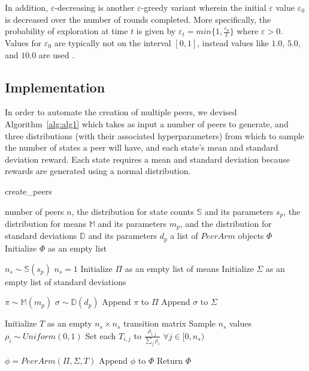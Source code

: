 \documentclass{article}
\begin{document}
In addition, $\varepsilon$-decreasing is another $\varepsilon$-greedy variant wherein the initial $\varepsilon$ value $\varepsilon_0$ is decreased over the number of rounds 
completed. More specifically, the probability of exploration at time $t$ is given by $\varepsilon_t = min\{ 1, \frac{\varepsilon_0}{t}\}$ where $\varepsilon > 0$. Values for 
$\varepsilon_0$ are typically not on the interval $[0,1]$, instead values like $1.0$, $5.0$, and $10.0$ are used \cite{mab_algos}.





\subsection{Implementation}
In order to automate the creation of multiple peers, we devised Algorithm~\ref{alg:alg1} which takes as input a number of peers to generate, and three distributions (with 
their associated hyperparameters) from which to sample the number of states a peer will have, and each state's mean and standard deviation reward. Each state requires a 
mean and standard deviation because rewards are generated using a normal distribution.

\begin{algorithm}[tb]
    \caption{create\_peers}
    \label{alg:alg1}
\begin{algorithmic}
     number of peers $n$, the distribution for state counts $\mathbb{S}$ and its parameters $s_p$, the distribution for means $\mathbb{M}$ and 
    its parameters $m_p$, and the distribution for standard deviations $\mathbb{D}$ and its parameters $d_p$
     a list of $PeerArm$ objects $\Phi$
    \STATE Initialize $\Phi$ as an empty list
    
    \STATE $n_s \sim \mathbb{S}(s_p)$
    \STATE $n_s = 1$
    \ENDIF
    \STATE Initialize $\Pi$ as an empty list of means
    \STATE Initialize $\Sigma$ as an empty list of standard deviations

    \STATE $\pi \sim \mathbb{M}(m_p)$
    \STATE $\sigma \sim \mathbb{D}(d_p)$
    \STATE Append $\pi$ to $\Pi$
    \STATE Append $\sigma$ to $\Sigma$
    \ENDFOR

    \STATE Initialize $T$ as an empty $n_s \times n_s$ transition matrix
    \STATE Sample $n_s$ values $\rho_i \sim Uniform(0, 1)$
    \STATE Set each $T_{i,j}$ to $\frac{\rho_{i,j}}{\sum_j\rho_i}$ $\forall j \in [0, n_s)$
    \ENDFOR

    \STATE $\phi = PeerArm(\Pi, \Sigma, T)$
    \STATE Append $\phi$ to $\Phi$
    \ENDFOR
    \STATE Return $\Phi$
\end{algorithmic}
\end{algorithm}
\end{document}
